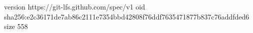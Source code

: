 version https://git-lfs.github.com/spec/v1
oid sha256:e2c36171de7ab86c2111e7354bbd42808f76ddf7635471877b837c76addfded6
size 558
